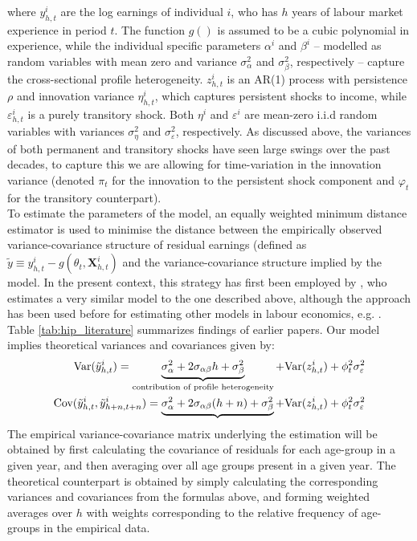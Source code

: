 where $y_{h,t}^i$ are the log earnings of individual $i$, who has $h$ years of
labour market experience in period $t$. The function $g()$ is assumed to be
a cubic polynomial in experience, while the individual specific parameters
$\alpha^i$ and $\beta^i$ -- modelled as random variables with mean zero and
variance $\sigma^2_{\alpha}$ and $\sigma^2_{\beta}$, respectively --
 capture the cross-sectional profile heterogeneity.
$z_{h,t}^i$ is an AR(1) process with persistence $\rho$ and innovation variance
$\eta_{h,t}^i$, which captures persistent shocks to income, while
$\varepsilon_{h,t}^i$ is a purely transitory shock. Both $\eta^i$ and
$\varepsilon^i$ are mean-zero i.i.d random variables with variances
$\sigma^2_{\eta}$ and $\sigma^2_{\varepsilon}$, respectively. As discussed
above, the variances of both permanent and transitory shocks have seen large
swings over the past decades, to capture this we are allowing for time-variation
in the innovation variance (denoted $\pi_t$ for the innovation to the persistent
shock component and $\varphi_t$ for the transitory counterpart). \\
To estimate the parameters of the model, an equally weighted minimum distance
estimator is used to minimise the distance between the empirically observed
variance-covariance structure of residual earnings (defined as $\tilde{y} \equiv
y_{h,t}^i - g(\theta_t, \pmb{X}_{h,t}^i)$ and the variance-covariance
structure implied by the model. In the present context, this strategy has first
been employed by \citet{Baker1997}, who estimates a very similar model to the one
 described above, although the approach has been used before for estimating
other models in labour economics, e.g. \citet{AbowdCard89}. Table 
\ref{tab:hip_literature} summarizes findings of earlier papers. Our model implies
theoretical variances and covariances given by:
\begin{align}
\mbox{Var}(\tilde{y}_{h,t}^i) = \underbrace{\sigma^2_{\alpha} + 2 \sigma_{\alpha \beta} h + \sigma^2_{\beta}}_{\text{contribution of profile heterogeneity}} + \mbox{Var}(z^i_{h,t}) + \phi_t^2 \sigma^2_{\varepsilon} \\
\mbox{Cov}(\tilde{y}_{h,t}^i, \tilde{y}_{h+n,t+n}^i) = \underbrace{\sigma^2_{\alpha} + 2 \sigma_{\alpha \beta} (h+n) + \sigma^2_{\beta}} + \mbox{Var}(z^i_{h,t}) + \phi_t^2 \sigma^2_{\varepsilon}
\end{align}
The empirical variance-covariance matrix underlying the estimation will be
obtained by first calculating the covariance of residuals for each age-group
in a given year, and then averaging over all age groups present in a given year.
The theoretical counterpart is obtained by simply calculating the corresponding
variances and covariances from the formulas above, and forming weighted averages
over $h$ with weights corresponding to the relative frequency of age-groups in
the empirical data.

